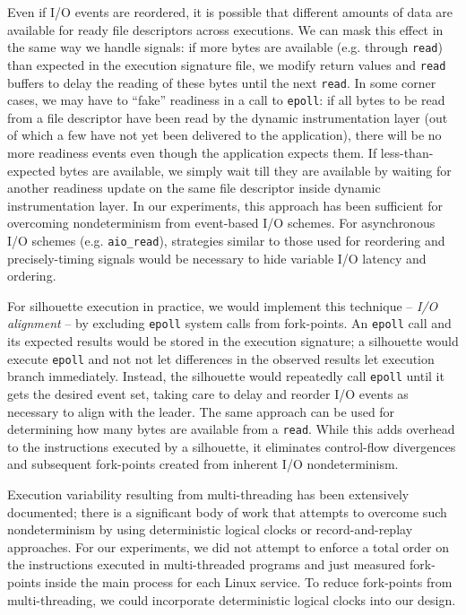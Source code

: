 Even if I/O events are reordered,
it is possible that different amounts
of data are available for ready
file descriptors across executions. We can 
mask this effect in the same
way we handle signals: if more bytes
are available (e.g. through \texttt{read}) 
than expected in the execution signature
file, we modify return values and \texttt{read}
buffers to delay the reading of these bytes
until the next \texttt{read}. In some corner
cases, we may have to ``fake'' readiness
in a call to \texttt{epoll}: if all bytes to be read from
a file descriptor have been read by 
the dynamic instrumentation layer (out of which
a few have not yet been delivered to the application),
there will be no more readiness events even
though the application expects them. If less-than-expected
bytes are available, we simply wait
till they are available by waiting for
another readiness update on the same file descriptor inside 
dynamic instrumentation layer.
In our experiments, this approach has been sufficient 
for overcoming nondeterminism from event-based I/O
schemes.
For asynchronous I/O schemes (e.g. \texttt{aio\_read}), strategies
similar to those used for reordering
and precisely-timing signals would be necessary to hide
variable I/O latency and ordering.

For silhouette execution in practice,
we would implement this technique -- {\em I/O alignment} -- by excluding \texttt{epoll} system calls
from fork-points. An \texttt{epoll}
call and its expected results
would be stored in the execution signature;
a silhouette would execute \texttt{epoll}
and not not let differences in the observed results 
let execution branch immediately. Instead,
the silhouette would repeatedly call
\texttt{epoll} until it gets the desired
event set, taking care to delay
and reorder I/O events as necessary
to align with the leader.
The same approach
can be used for determining 
how many bytes are available
from a \texttt{read}. While this 
adds overhead to the instructions
executed by a silhouette, it eliminates control-flow 
divergences and subsequent fork-points created from
inherent I/O nondeterminism. \newline

 \newline
Execution variability resulting from multi-threading
has been extensively documented; there
is a significant body of work that
attempts to overcome such nondeterminism
by using deterministic logical clocks
or record-and-replay approaches. 
For our experiments, we did not attempt to enforce
a total order on the instructions executed in multi-threaded
programs and just measured fork-points inside 
the main process for each Linux service.
To reduce fork-points from multi-threading, we could incorporate
deterministic logical clocks 
into our design.

